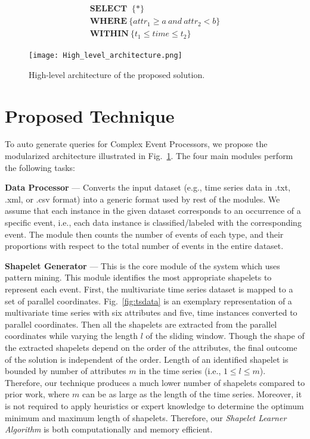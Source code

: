 \documentclass[conference]{IEEEtran}  %
\begin{document}
\begin{equation}
\begin{split}
\textbf{SELECT }\ \{*\} \\ \textbf{WHERE}\ \{attr_1\geq a\ and \ attr_2<b\} \\ \textbf{WITHIN}\ \{t_1\leq time\leq t_2\}
\label{eq:query}
\end{split}
\end{equation}

\begin{figure}
\texttt{[image: High\_level\_architecture.png]}
\caption{High-level architecture of the proposed solution.}
\label{fig:archi}
\end{figure}

\section{Proposed Technique}
To auto generate queries for Complex Event Processors, we propose the modularized architecture illustrated in Fig.~\ref{fig:archi}. The four main modules perform the following tasks:

\textbf{Data Processor} --- Converts the input dataset (e.g., time series data in .txt, .xml, or .csv format) into a generic format used by rest of the modules. We assume that each instance in the given dataset corresponds to an occurrence of a specific event, i.e., each data instance is classified/labeled with the corresponding event. The module then counts the number of events of each type, and their proportions with respect to the total number of events in the entire dataset.

\textbf{Shapelet Generator}	--- This is the core module of the system which uses pattern mining. This module identifies the most appropriate shapelets to represent each event. First, the multivariate time series dataset is mapped to a set of parallel coordinates. Fig.~\ref{fig:tsdata} is an exemplary representation of a multivariate time series with six attributes and five, time instances converted to parallel coordinates. Then all the shapelets are extracted from the parallel coordinates while varying the length $l$ of the sliding window. Though the shape of the extracted shapelets depend on the order of the attributes, the final outcome of the solution is independent of the order. Length of an identified shapelet is bounded by number of attributes $m$ in the time series (i.e., $1 \leq l \leq m$). Therefore, our technique produces a much lower number of shapelets compared to prior work, where $m$ can be as large as the length of the time series. Moreover, it is not required to apply heuristics or expert knowledge to determine the optimum minimum and maximum length of shapelets. Therefore, our \textit{Shapelet Learner Algorithm} is both computationally and memory efficient.
\end{document}
